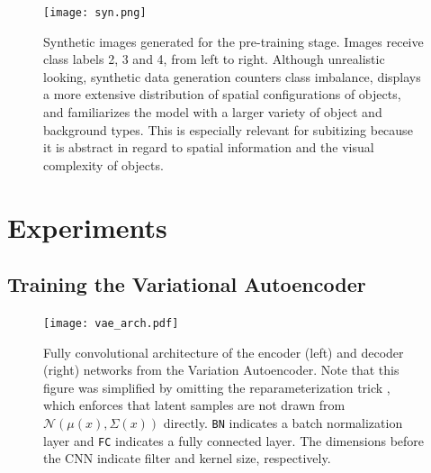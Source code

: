 \documentclass[twocolumn]{article}
\begin{document}
\begin{figure}
\centering
\texttt{[image: syn.png]}
\caption{Synthetic images generated for the pre-training stage. Images receive class labels 2, 3 and 4, from left to right. Although unrealistic looking, synthetic data generation counters class imbalance, displays a more extensive distribution of spatial configurations of objects, and familiarizes the model with a larger variety of object and background types. This is especially relevant for subitizing because it is abstract in regard to spatial information and the visual complexity of objects.}
\label{fig:syn}
\end{figure}

\newpage
\hypertarget{experiments}{%
\section{Experiments}\label{experiments}}

\hypertarget{vae-train}{%
\subsection{Training the Variational Autoencoder} \label{vae-train}}

\begin{figure}
\centering
\texttt{[image: vae\_arch.pdf]}
\caption{Fully convolutional architecture of the encoder (left) and decoder (right) networks from the Variation Autoencoder. Note that this figure was simplified by omitting the reparameterization trick \citep{kingma2013auto}, which enforces that latent samples are not drawn from \(\mathcal{N}(\mu(x), \Sigma(x))\) directly. \texttt{BN} indicates a batch normalization layer \citep{ioffe2015batch} and \texttt{FC} indicates a fully connected layer. The dimensions before the CNN indicate filter and kernel size, respectively.}
\label{fig:vae-arch}
\end{figure}
\end{document}
